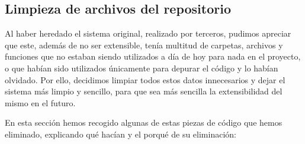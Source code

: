 \subsection{Limpieza de archivos del repositorio}
\label{limpiezaArchivos}

Al haber heredado el sistema original, realizado por terceros, pudimos apreciar que este, además de no ser extensible, tenía multitud de carpetas, archivos y funciones que no estaban siendo utilizados a día de hoy para nada en el proyecto, o que habían sido utilizados únicamente para depurar el código y lo habían olvidado. Por ello, decidimos limpiar todos estos datos innecesarios y dejar el sistema más limpio y sencillo, para que sea más sencilla la extensibilidad del mismo en el futuro.

En esta sección hemos recogido algunas de estas piezas de código que hemos eliminado, explicando qué hacían y el porqué de su eliminación:

